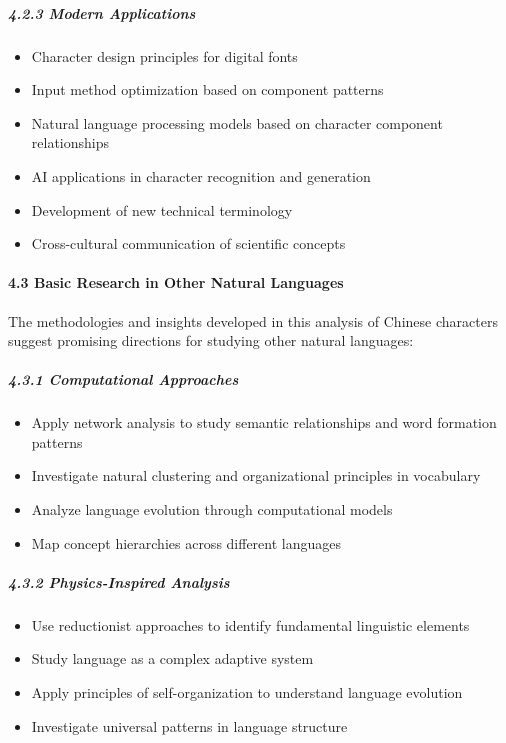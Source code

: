 \documentclass[
  11pt,
  letterpaper,
]{article}
\providecommand{\tightlist}{%
  \setlength{\itemsep}{0pt}\setlength{\parskip}{0pt}}
\begin{document}
\subparagraph{4.2.3 Modern Applications}\label{modern-applications}

\begin{itemize}
\tightlist
\item
  Character design principles for digital fonts
\item
  Input method optimization based on component patterns
\item
  Natural language processing models based on character component
  relationships
\item
  AI applications in character recognition and generation
\item
  Development of new technical terminology
\item
  Cross-cultural communication of scientific concepts
\end{itemize}

\paragraph{4.3 Basic Research in Other Natural
Languages}\label{basic-research-in-other-natural-languages}

The methodologies and insights developed in this analysis of Chinese
characters suggest promising directions for studying other natural
languages:

\subparagraph{4.3.1 Computational
Approaches}\label{computational-approaches}

\begin{itemize}
\tightlist
\item
  Apply network analysis to study semantic relationships and word
  formation patterns
\item
  Investigate natural clustering and organizational principles in
  vocabulary
\item
  Analyze language evolution through computational models
\item
  Map concept hierarchies across different languages
\end{itemize}

\subparagraph{4.3.2 Physics-Inspired
Analysis}\label{physics-inspired-analysis}

\begin{itemize}
\tightlist
\item
  Use reductionist approaches to identify fundamental linguistic
  elements
\item
  Study language as a complex adaptive system
\item
  Apply principles of self-organization to understand language evolution
\item
  Investigate universal patterns in language structure
\end{itemize}
\end{document}
